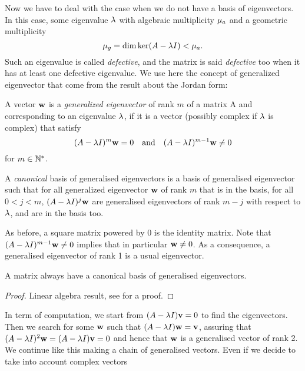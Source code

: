 Now we have to deal with the case when we do not have a basis of eigenvectors. In this case, some eigenvalue $\lambda$ with algebraic multiplicity $\mu_a$ and a geometric multiplicity
$$\mu_g=\dim\ker(A-\lambda I) < \mu_a.$$
Such an eigenvalue is called \emph{defective}, and the matrix is said \emph{defective} too when it has at least one defective eigenvalue. We use here the concept of generalized eigenvector that come from the result about the Jordan form:

\begin{definition}
    A vector $\mathbf{w}$ is a \emph{generalized eigenvector} of rank $m$  of a matrix A and corresponding to an eigenvalue $\lambda$, if it is a vector (possibly complex if $\lambda$ is complex) that satisfy
    $$(A-\lambda I)^m\mathbf{w}=0 \quad\text{and}\quad (A-\lambda I)^{m-1}\mathbf{w}\neq0$$
    for $m\in\mathbb{N}^*$.
    
    A \emph{canonical} basis of generalised eigenvectors is a basis of generalised eigenvector such that for all generalized eigenvector $\mathbf{w}$ of rank $m$ that is in the basis, for all $0<j<m$, $(A-\lambda I)^j\mathbf{w}$ are generalised eigenvectors of rank $m-j$ with respect to $\lambda$, and are in the basis too.
\end{definition}

\begin{remarque}
As before, a square matrix powered by 0 is the identity matrix. Note that $(A-\lambda I)^{m-1}\mathbf{w}\neq0$ implies that in particular $\mathbf{w}\neq0$. As a consequence, a generalised eigenvector of rank 1 is a usual eigenvector.
\end{remarque}
    
\begin{theoreme}
    A matrix always have a canonical basis of generalised eigenvectors.
\end{theoreme}
\begin{proof}
    Linear algebra result, see  for a proof.
\end{proof}

In term of computation, we start from $(A-\lambda I)\mathbf{v}=0$ to find the eigenvectors. Then we search for some $\mathbf{w}$ such that $(A-\lambda I)\mathbf{w}=\mathbf{v}$, assuring that $(A-\lambda I)^2\mathbf{w}=(A-\lambda I)\mathbf{v}=0$ and hence that $\mathbf{w}$ is a generalised vector of rank 2. We continue like this making a chain of generalised vectors. Even if we decide to take into account complex vectors

